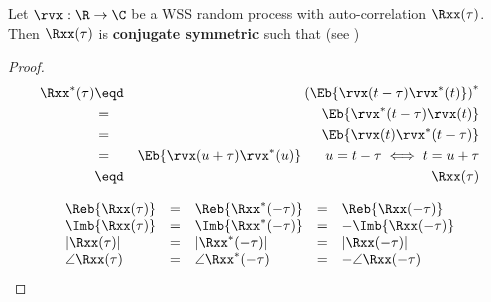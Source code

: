 \begin{theorem}
Let $\rvx:\R\to\C$ be a WSS random process with
auto-correlation $\Rxx(\tau)$.
Then $\Rxx(\tau)$ is \textbf{conjugate symmetric} such that
(see )
\end{theorem}
\begin{proof}
\begin{eqnarray*}
   \Rxx^\ast(\tau)
     &\eqd& \left( \Eb{\rvx(t-\tau)\rvx^\ast(t)}\right)^\ast
   \\&=&           \Eb{\rvx^\ast(t-\tau)\rvx(t)}
   \\&=&           \Eb{\rvx(t)\rvx^\ast(t-\tau)}
   \\&=&           \Eb{\rvx(u+\tau)\rvx^\ast(u)}
       \hspace{4ex}u=t-\tau \iff t=u+\tau
   \\&\eqd&        \Rxx(\tau)
\end{eqnarray*}

\[\begin{array}{*{10}{l}}
   \Reb{\Rxx(\tau)}
     &=& \Reb{\Rxx^\ast(-\tau)}
     &=& \Reb{\Rxx(-\tau)}
\\
   \Imb{\Rxx(\tau)}
     &=& \Imb{\Rxx^\ast(-\tau)}
     &=& -\Imb{\Rxx(-\tau)}
\\
   |\Rxx(\tau)|
     &=& |\Rxx^\ast(-\tau)|
     &=& |\Rxx(-\tau)|
\\
   \angle\Rxx(\tau)
     &=& \angle\Rxx^\ast(-\tau)
     &=& -\angle\Rxx(-\tau)
\end{array}\]

\end{proof}


